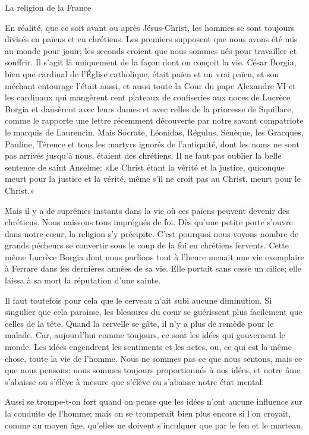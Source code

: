 \begin{chapter}{La religion de la France}
\horizontalLine

En réalité, que ce soit avant ou après Jésus-Christ, les hommes se sont
toujours divisés en païens et en chrétiens. Les premiers supposent que
nous avons été mis au monde pour jouir; les seconds croient que nous
sommes nés pour travailler et souffrir. Il s'agit là uniquement de la
façon dont on conçoit la vie. César Borgia, bien que cardinal de
l'Église catholique, était païen et un vrai païen, et son méchant
entourage l'était aussi, et aussi toute la Cour du pape Alexandre VI et
les cardinaux qui mangèrent cent plateaux de confiseries aux noces de
Lucrèce Borgia et dansèrent avec leurs dames et avec celles de la
princesse de Squillace, comme le rapporte une lettre récemment
découverte par notre savant compatriote le marquis de Laurencin. Mais
Socrate, Léonidas, Régulus, Sénèque, les Gracques, Pauline, Térence et
tous les martyrs ignorés de l'antiquité, dont les noms ne sont pas
arrivés jusqu'à nous, étaient des chrétiens. Il ne faut pas oublier la
belle sentence de saint Anselme: «Le Christ étant la vérité et la
justice, quiconque meurt pour la justice et la vérité, même s'il ne
croit pas au Christ, meurt pour le Christ.»

Mais il y a de suprêmes instants dans la vie où ces païens peuvent
devenir des chrétiens. Nous naissons tous imprégnés de foi. Dès qu'une
petite porte s'ouvre dans notre cœur, la religion s'y précipite.
C'est pourquoi nous voyons nombre de grands pécheurs se convertir sous
le coup de la foi en chrétiens fervents. Cette même Lucrèce Borgia dont
nous parlions tout à l'heure menait une vie exemplaire à Ferrare dans
les dernières années de sa vie. Elle portait sans cesse un cilice; elle
laissa à sa mort la réputation d'une sainte.

Il faut toutefois pour cela que le cerveau n'ait subi aucune diminution.
Si singulier que cela paraisse, les blessures du cœur se guérissent
plus facilement que celles de la tête. Quand la cervelle se gâte, il n'y
a plus de remède pour le malade. Car, aujourd'hui comme toujours, ce
sont les idées qui gouvernent le monde. Les idées engendrent les
sentiments et les actes, ou, ce qui est la même chose, toute la vie de
l'homme. Nous ne sommes pas ce que nous sentons, mais ce que nous
pensons; nous sommes toujours proportionnés à nos idées, et notre âme
s'abaisse ou s'élève à mesure que s'élève ou s'abaisse notre état
mental.

Aussi se trompe-t-on fort quand on pense que les idées n'ont aucune
influence sur la conduite de l'homme; mais on se tromperait bien plus
encore si l'on croyait, comme au moyen âge, qu'elles ne doivent
s'inculquer que par le feu et le marteau.


\end{chapter}
